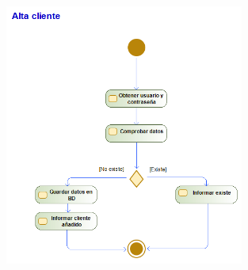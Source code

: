 \begin{figure}[H]
    \centering
    \includegraphics[width=0.7\textwidth]{Use_Cases/alta_cliente.png}
\end{figure}
\newpage
